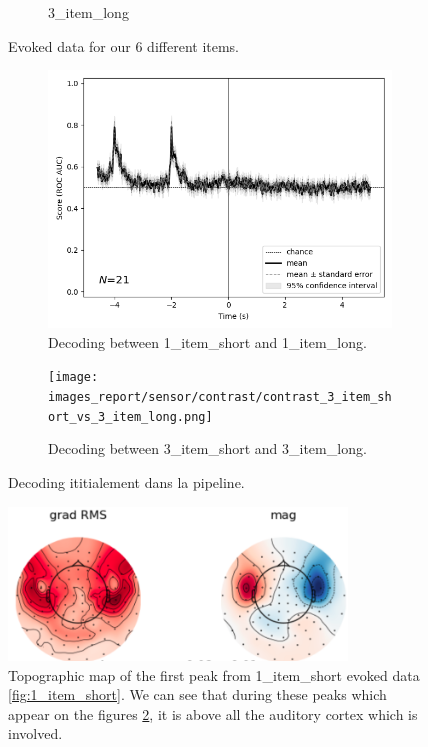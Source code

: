 \begin{figure}[htb]
\begin{subfigure}{0.25\textwidth}
        \caption{3\_item\_long}
        \label{fig:3_item_long}
    \end{subfigure}
    \caption[Evoked data for our 6 different items.]%
    {Evoked data for our 6 different items.}
    \label{fig:Evoked_data}
\end{figure}


\begin{figure}
    \centering
    \begin{subfigure}{.5\textwidth}
        \centering
        \includegraphics[width=1.\linewidth]{images_report/sensor/contrast/contrast_1_item_short_vs_1_item_long.png}
        \caption{Decoding between 1\_item\_short and 1\_item\_long.}
        \label{fig:decoding_1_item}
    \end{subfigure}%
    \begin{subfigure}{.5\textwidth}
        \centering
        \texttt{[image: images\_report/sensor/contrast/contrast\_3\_item\_short\_vs\_3\_item\_long.png]}
        \caption{Decoding between 3\_item\_short and 3\_item\_long.}
        \label{fig:decoding_3_item}
    \end{subfigure}
    \caption{Decoding ititialement dans la pipeline.}
    \label{fig:decoding_initial}
\end{figure}

\begin{figure}[ht]
    \centering
    \includegraphics[width=9cm]{images_report/sensor/auditory_cortex.png}
    \caption[Topographic map of the first peak from 1\_item\_short.]%
    {Topographic map of the first peak from 1\_item\_short evoked data \ref{fig:1_item_short}. We can see that during these peaks which appear on the figures \ref{fig:Evoked_data}, it is above all the auditory cortex which is involved.}
    \label{auditory_cortex}
\end{figure}

